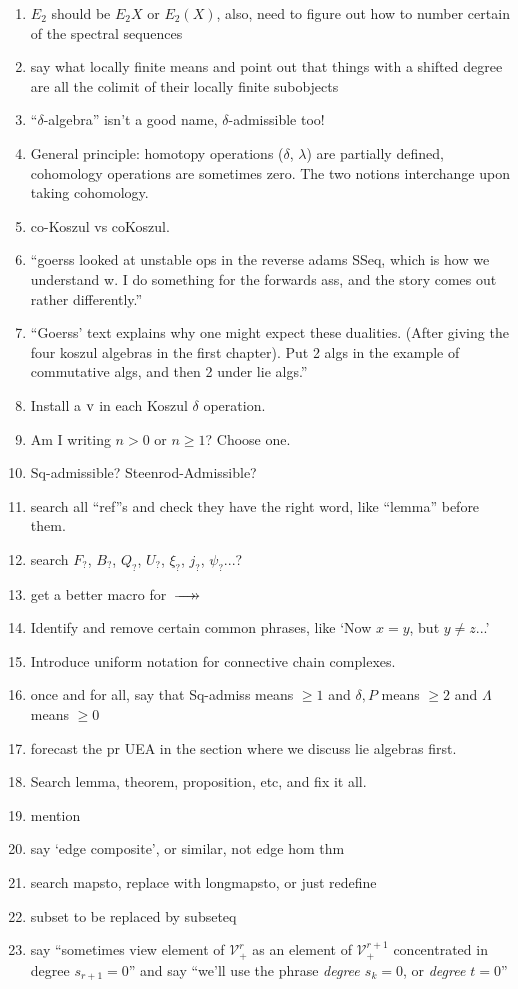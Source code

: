 \documentclass[11pt]{amsart}
\theoremstyle{plain}
\theoremstyle{definition}
\renewcommand{\to}{\longrightarrow}
\newcommand{\calV}{\mathcal{V}}
\theoremstyle{plain}
\newcommand{\vect}[2]{\calV^{#1}_{#2}}
\newcommand{\epi}{{\,\makebox[0cm][l]{\ensuremath\to}\to}}
\newcommand{\Sq}{\mathrm{Sq}}
\begin{document}
\begin{todolist}
\begin{enumerate}
\item $E_2$ should be $E_2X$ or $E_2(X)$, also, need to figure out how to number certain of the spectral sequences
\item say what locally finite means and point out that things with a shifted degree are all the colimit of their locally finite subobjects
\item ``$\delta$-algebra'' isn't a good name, $\delta$-admissible too!
\item General principle: homotopy operations ($\delta$, $\lambda$) are partially defined, cohomology operations are sometimes zero. The two notions interchange upon taking cohomology.
\item co-Koszul vs coKoszul.
\item ``goerss looked at unstable ops in the reverse adams SSeq, which is how we understand w. I do something for the forwards ass, and the story comes out rather differently.''
\item 
``Goerss' text explains why one might expect these dualities. (After giving the four koszul algebras in the first chapter). Put 2 algs in the example of commutative algs, and then 2 under lie algs.''
\item Install a $\textup{v}$ in each Koszul $\delta$ operation.
\item Am I writing $n>0$ or $n\geq1$? Choose one.
\item $\Sq$-admissible? Steenrod-Admissible?
\item search all ``ref''s and check they have the right word, like ``lemma'' before them.
\item search $F_?$, $B_?$, $Q_?$, $U_?$, $\xi_?$, $j_?$, $\psi_?$...?
\item get a better macro for $\epi$
\item Identify and remove certain common phrases, like `Now $x=y$, but $y\neq z$...'
\item Introduce uniform notation for connective chain complexes.
\item once and for all, say that Sq-admiss means $\geq1$ and $\delta,P$ means $\geq2$ and $\Lambda$ means $\geq0$
\item forecast the pr UEA in the section where we discuss lie algebras first.
\item Search lemma, theorem, proposition, etc, and fix it all.
\item mention %
\item say `edge composite', or similar, not edge hom thm
\item search mapsto, replace with longmapsto, or just redefine
\item subset to be replaced by subseteq
\item say ``sometimes view element of $\vect{r}{+}$ as an element of $\vect{r+1}{+}$ concentrated in degree $s_{r+1}=0$'' and say ``we'll use the phrase \emph{degree $s_k=0$}, or \emph{degree $t=0$}''
\end{enumerate}
\end{todolist}
\end{document}
